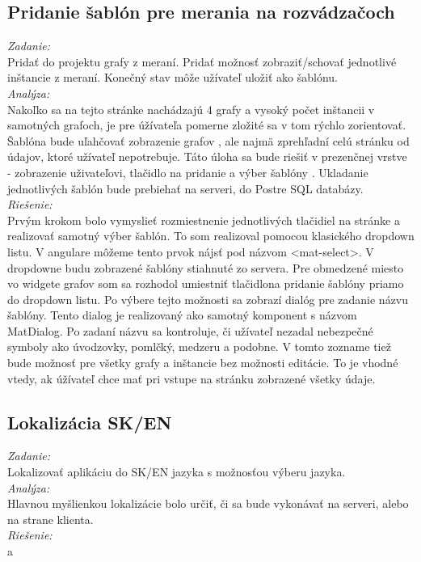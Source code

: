 \documentclass[11pt, oneside]{report}
\begin{document}
\subsection*{Pridanie šablón pre merania na rozvádzačoch }
\textit{Zadanie:}\\
Pridať do projektu grafy  z meraní. Pridať možnosť zobraziť/schovať jednotlivé inštancie  z meraní. Konečný stav môže užívateľ uložiť ako šablónu.
\\\textit{Analýza:}\\
 Nakoľko sa na tejto stránke nachádzajú 4 grafy  a vysoký počet inštancii v samotných grafoch, je pre úžívateľa pomerne zložité sa v tom rýchlo zorientovať. 
Šablóna bude uľahčovať zobrazenie grafov , ale najmä zprehľadní celú stránku od  údajov, ktoré užívateľ nepotrebuje. Táto úloha sa bude riešiť v prezenčnej vrstve - zobrazenie uživateľovi, tlačidlo na pridanie a výber šablóny . Ukladanie jednotlivých šablón bude prebiehať  na serveri, do Postre SQL databázy.
\\\textit{Riešenie:}\\
Prvým krokom bolo vymyslieť rozmiestnenie jednotlivých  tlačidiel na stránke a realizovať samotný výber šablón. To som realizoval pomocou klasického dropdown listu. V angulare môžeme tento  prvok nájsť pod názvom \textsf{<mat-select>}. V dropdowne budu zobrazené šablóny stiahnuté zo servera. Pre obmedzené miesto vo widgete grafov som sa rozhodol umiestniť tlačidlona pridanie šablóny priamo do dropdown listu. Po výbere tejto možnosti sa zobrazí dialóg pre zadanie názvu šablóny. Tento dialog je realizovaný ako samotný komponent s názvom  \textsf{MatDialog}. Po zadaní názvu sa kontroluje, či užívateľ nezadal nebezpečné symboly ako úvodzovky, pomlčký, medzeru  a podobne. V  tomto zozname tiež bude možnosť pre všetky grafy a inštancie bez možnosti editácie. To je vhodné vtedy, ak úžívateľ chce mať pri vstupe na stránku zobrazené všetky údaje. 
\subsection*{Lokalizácia SK/EN}
\textit{Zadanie:}\\
Lokalizovať aplikáciu do SK/EN jazyka s možnosťou výberu jazyka.
\\\textit{Analýza:}\\
Hlavnou myšlienkou lokalizácie bolo určiť, či sa bude vykonávať na serveri, alebo na strane klienta.
\\\textit{Riešenie:}\\
a
\end{document}

